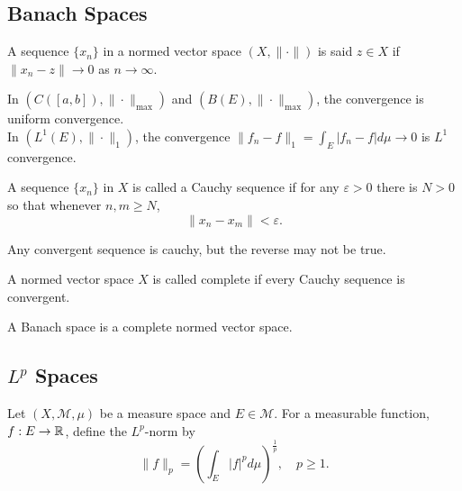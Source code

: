 \documentclass[class=book, crop=false]{standalone}
\begin{document}
        \subsection{Banach Spaces}
        \begin{definition}[Convergence]
            A sequence $\{x_n\}$ in a normed vector space $(X, \|\cdot\|)$ is said $z \in X$ if $\|x_n - z\| \rightarrow 0$ as $n \rightarrow \infty$.
        \end{definition}
        \begin{remark}
            In $\left(C([a, b]), \|\cdot\|_{\max}\right)$ and $\left(B(E), \|\cdot\|_{\max}\right)$, the convergence is uniform convergence. \\
            In $\left(L^1(E), \|\cdot\|_{1}\right)$, the convergence $\|f_n - f\|_1 = \int_E |f_n - f| d\mu \rightarrow 0$ is $L^1$ convergence.
        \end{remark}

        \begin{definition}
            A sequence $\{x_n\}$ in $X$ is called a Cauchy sequence if for any $\varepsilon > 0$ there is $N > 0$ so that whenever $n, m \geq N$,
            \begin{equation*}
                \|x_n - x_m\| < \varepsilon.
            \end{equation*}
        \end{definition}
        \begin{remark}
            Any convergent sequence is cauchy, but the reverse may not be true.
        \end{remark}

        \begin{definition}[Completeness]
            A normed vector space $X$ is called complete if every Cauchy sequence is convergent.
        \end{definition}

        \begin{definition}
            A Banach space is a complete normed vector space.
        \end{definition}

        \subsection{$L^p$ Spaces}
        \begin{definition}[$L^p$ Norm]
            Let $(X, \mathscr{M}, \mu)$ be a measure space and $E \in \mathscr{M}$. For a measurable function, $f : E \rightarrow \mathbb{R}$, define the $L^p$-norm by
            \begin{equation*}
                \|f\|_p = \left(\int_E |f|^p d\mu\right)^{\frac{1}{p}}, \quad p \geq 1.
            \end{equation*}
        \end{definition}
\end{document}
